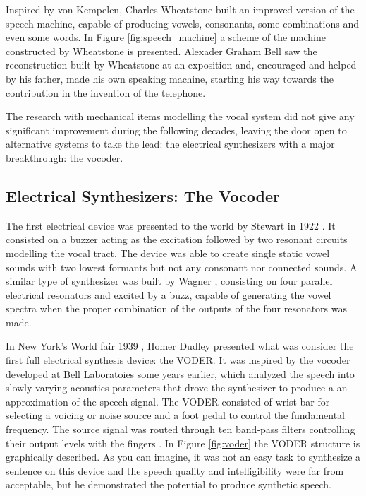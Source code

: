 Inspired by von Kempelen, Charles Wheatstone built an improved version of the speech machine, capable of producing vowels, consonants, some combinations and even some words. In Figure \ref{fig:speech_machine} a scheme of the machine constructed by Wheatstone is presented. Alexader Graham Bell saw the reconstruction built by Wheatstone at an exposition and, encouraged and helped by his father, made his own speaking machine, starting his way towards the contribution in the invention of the telephone.

The research with mechanical items modelling the vocal system did not give any significant improvement during the following decades, leaving the door open to alternative systems to take the lead: the electrical synthesizers with a major breakthrough: the vocoder.

\subsection{Electrical Synthesizers: The Vocoder}
\label{history_vocoder}
The first electrical device was presented to the world by Stewart in 1922 \cite{Klatt87}. It consisted on a buzzer acting as the excitation followed by two resonant circuits modelling the vocal tract. The device was able to create single static vowel sounds with two lowest formants but not any consonant nor connected sounds. A similar type of synthesizer was built by Wagner \cite{flanagan_book}, consisting on four parallel electrical resonators and excited by a buzz, capable of generating the vowel spectra when the proper combination of the outputs of the four resonators was made.

In New York's World fair 1939 \cite{flanagan_book, Klatt87, flanagan_1973_speech}, Homer Dudley presented what was consider the first full electrical synthesis device: the VODER. It was inspired by the vocoder developed at Bell Laboratoies some years earlier, which analyzed the speech into slowly varying acoustics parameters that drove the synthesizer to produce a an approximation of the speech signal. The VODER consisted of wrist bar for selecting a voicing or noise source and a foot pedal to control the fundamental frequency. The source signal was routed through ten band-pass filters controlling their output levels with the fingers \cite{LemmettyMSc}. In Figure \ref{fig:voder} the VODER structure is graphically described. As you can imagine, it was not an easy task to synthesize a sentence on this device and the speech quality and intelligibility were far from acceptable, but he demonstrated the potential to produce synthetic speech.


